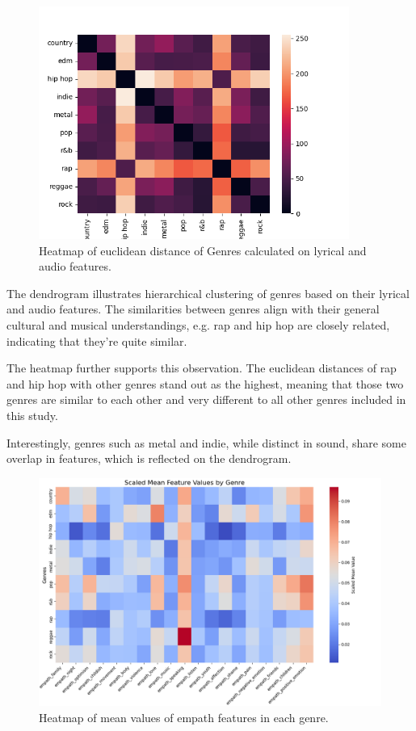 \begin{center}
\begin{figure}[H]
  \centering
  \includegraphics[width=4in]{img/genres_similarity_heatmap.png}
  \caption{Heatmap of euclidean distance of Genres calculated on lyrical and
  audio features.}
  \label{Figure:dendrogram_spotify_features}
\end{figure}
\end{center}

The dendrogram illustrates hierarchical clustering of genres based on their
lyrical and audio features. The similarities between genres align with their
general cultural and musical understandings, e.g. rap and hip hop are closely
related, indicating that they're quite similar. 

The heatmap further supports this observation. The euclidean distances of rap
and hip hop with other genres stand out as the highest, meaning that those two
genres are similar to each other and very different to all other genres
included in this study. 

Interestingly, genres such as metal and indie, while
distinct in sound, share some overlap in features, which is reflected on the
dendrogram.


\begin{center}
\begin{figure}[H]
  \centering
  \includegraphics[width=6in]{img/heatmap_of_empath.png}
  \caption{Heatmap of mean values of empath features in each genre.}
  \label{Figure:heatmap_empath}
\end{figure}
\end{center}


